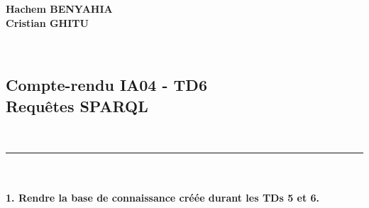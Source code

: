 \documentclass[11pt]{report}
\begin{document}
\noindent
\textbf{Hachem BENYAHIA}
~\\
\textbf{Cristian GHITU}

~\\
\begin{center}
\section*{Compte-rendu IA04 - TD6 ~\\ Requêtes SPARQL}

~\\
\rule{\textwidth}{1pt}
\end{center}

~\\\\
\textbf{1. Rendre la base de connaissance créée durant les TDs 5 et 6.}
\end{document}
